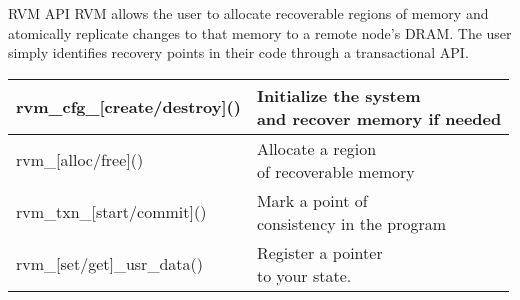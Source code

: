 \begin{block}{RVM API}
    RVM allows the user to allocate recoverable regions of memory and
    atomically replicate changes to that memory to a remote node’s DRAM. The
    user simply identifies recovery points in their code through a
    transactional API.

    \vspace{1ex}

    \begin{tabular}{ | l | l | }
        \hline rvm\_cfg\_[create/destroy]() & \pbox{20cm}{Initialize the system \\
        and recover memory if needed} \\
        \hline rvm\_[alloc/free]() & \pbox{20cm}{Allocate a region \\
        of recoverable memory} \\
        \hline rvm\_txn\_[start/commit]() & \pbox{20cm}{Mark a point of \\
        consistency in the program} \\
        \hline rvm\_[set/get]\_usr\_data() & \pbox{20cm}{Register a pointer \\
        to your state.} \\
        \hline
    \end{tabular}
\end{block}
